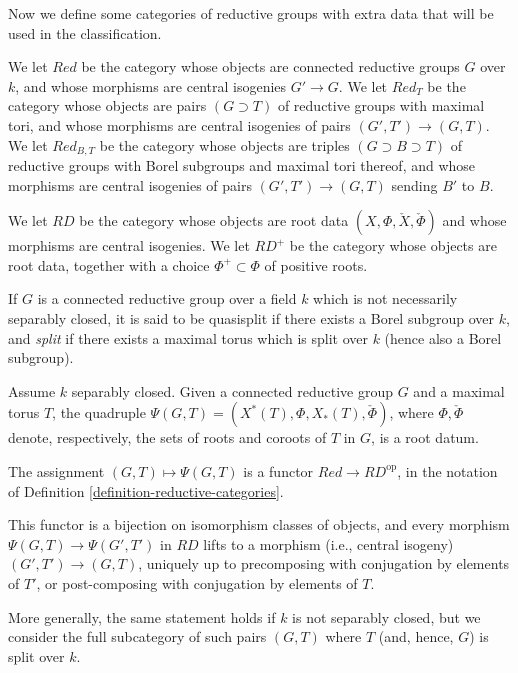 Now we define some categories of reductive groups with extra data that will be used in the classification.

\begin{definition}
 \label{definition-reductive-categories}
We let $Red$ be the category whose objects are connected reductive groups $G$ over $k$, and whose morphisms are central isogenies $G'\to G$. We let $Red_T$ be the category whose objects are pairs $(G\supset T)$ of reductive groups with maximal tori, and whose morphisms are central isogenies of pairs $(G',T')\to (G,T)$. We let $Red_{B,T}$ be the category whose objects are triples $(G\supset B\supset T)$ of reductive groups with Borel subgroups and maximal tori thereof, and whose morphisms are central isogenies of pairs $(G',T')\to (G,T)$ sending $B'$ to $B$.

We let $RD$ be the category whose objects are root data $(X,\Phi, \check X,\check\Phi)$ and whose morphisms are central isogenies. We let $RD^+$ be the category whose objects are root data, together with a choice $\Phi^+\subset \Phi$ of positive roots.
\end{definition}

\begin{definition}
\label{definition-split-nonsplit}
 If $G$ is a connected reductive group over a field $k$ which is not necessarily separably closed, it is said to be {quasisplit} if there exists a Borel subgroup over $k$, and {\it split} if there exists a maximal torus which is split over $k$ (hence also a Borel subgroup). 
\end{definition}



\begin{theorem}
\label{theorem-classification-reductive}
 Assume $k$ separably closed. Given a connected reductive group $G$ and a maximal torus $T$, the quadruple $\Psi(G,T)=(X^*(T), \Phi, X_*(T), \check\Phi)$, where $\Phi,\check\Phi$ denote, respectively, the sets of roots and coroots of $T$ in $G$, is a root datum.
 
 The assignment $(G,T)\mapsto \Psi(G,T)$ is a functor $Red \to RD^{\text{op}}$, in the notation of Definition \ref{definition-reductive-categories}.
 
 This functor is a bijection on isomorphism classes of objects, and every morphism $\Psi(G,T)\to \Psi(G',T')$ in $RD$ lifts to a morphism (i.e., central isogeny) $(G',T')\to (G,T)$, uniquely up to precomposing with conjugation by elements of $T'$, or post-composing with conjugation by elements of $T$.
 
 More generally, the same statement holds if $k$ is not separably closed, but we consider the full subcategory of such pairs $(G,T)$ where $T$ (and, hence, $G$) is split over $k$.
\end{theorem}

